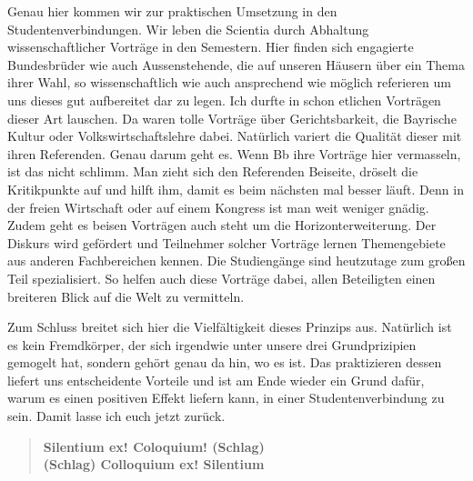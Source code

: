 Genau hier kommen wir zur praktischen Umsetzung in den Studentenverbindungen.
Wir leben die Scientia durch Abhaltung wissenschaftlicher Vorträge in
den Semestern. Hier finden sich engagierte Bundesbrüder wie auch
Aussenstehende, die auf unseren Häusern über ein Thema ihrer Wahl, so
wissenschaftlich wie auch ansprechend wie möglich referieren um uns dieses
gut aufbereitet dar zu legen. Ich durfte in schon etlichen Vorträgen dieser 
Art lauschen. Da waren tolle Vorträge über Gerichtsbarkeit, die Bayrische 
Kultur oder Volkswirtschaftslehre dabei. Natürlich variert die Qualität dieser
mit ihren Referenden. Genau darum geht es. Wenn Bb ihre Vorträge hier
vermasseln, ist das nicht schlimm. Man zieht sich den Referenden Beiseite, dröselt
die Kritikpunkte auf und hilft ihm, damit es beim nächsten mal besser läuft.
Denn in der freien Wirtschaft oder auf einem Kongress ist man weit weniger gnädig.
Zudem geht es beisen Vorträgen auch steht um die Horizonterweiterung. Der Diskurs
wird gefördert und Teilnehmer solcher Vorträge lernen Themengebiete aus anderen
Fachbereichen kennen. Die Studiengänge sind heutzutage zum großen Teil spezialisiert.
So helfen auch diese Vorträge dabei, allen Beteiligten einen breiteren Blick auf die
Welt zu vermitteln.

Zum Schluss breitet sich hier die Vielfältigkeit dieses Prinzips aus. Natürlich ist
es kein Fremdkörper, der sich irgendwie unter unsere drei Grundprizipien gemogelt hat, 
sondern gehört genau da hin, wo es ist. Das praktizieren dessen liefert uns 
entscheidente Vorteile und ist am Ende wieder ein Grund dafür, warum es einen
positiven Effekt liefern kann, in einer Studentenverbindung zu sein. Damit lasse ich
euch jetzt zurück.
\begin{quote}
    \textbf{
        Silentium ex! Coloquium! (Schlag)\\
        (Schlag) Colloquium ex! Silentium
    }
\end{quote}